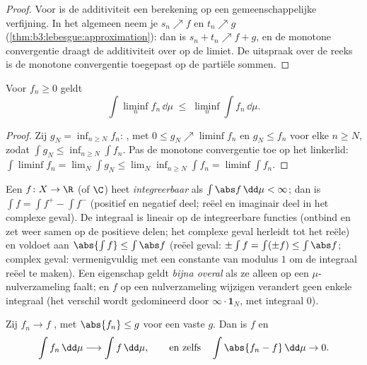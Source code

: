 \begin{proof}
Voor  is de additiviteit een berekening op een
gemeenschappelijke verfijning. In het algemeen neem je $s_n
\nearrow f$ en $t_n \nearrow g$
(\cref{thm:b3:lebesgue:approximation}): dan is $s_n + t_n \nearrow
f + g$, en de monotone convergentie draagt de additiviteit over op
de limiet. De uitspraak over de reeks is de monotone convergentie
toegepast op de partiële sommen.
\end{proof}

\begin{theorem}\label{thm:b3:lebesgue:fatou}
Voor  $f_n \geq 0$ geldt
\[
\int \liminf_n f_n \,\dd\mu \;\leq\; \liminf_n \int
f_n\,\dd\mu .
\]
\end{theorem}

\begin{proof}
Zij $g_N = \inf_{n\geq N}f_n$: , met $0 \leq g_N \nearrow
\liminf f_n$ en $g_N \leq f_n$ voor elke $n \geq N$, zodat $\int
g_N \leq \inf_{n \geq N}\int f_n$. Pas de monotone convergentie
toe op het linkerlid: $\int\liminf f_n = \lim_N\int g_N \leq
\lim_N\inf_{n\geq N}\int f_n = \liminf\int f_n$.
\end{proof}

\begin{definition}\label{def:b3:lebesgue:l1}
Een  $f \colon X \to \R$ (of $\C$) heet
\emph{integreerbaar} als
$\int\abs f\,\dd\mu < \infty$; dan is $\int f = \int f^+ - \int
f^-$ (positief en negatief deel; reëel en imaginair deel in het
complexe geval). De integraal is lineair op de integreerbare
functies (ontbind en zet weer samen op de positieve delen; het
complexe geval herleidt tot het reële) en voldoet aan $\abs{\int
f} \leq \int\abs f$ (reëel geval: $\pm\int f = \int(\pm f) \leq
\int\abs f$; complex geval: vermenigvuldig met een constante van
modulus $1$ om de integraal reëel te maken). Een eigenschap geldt
\emph{bijna overal} als ze alleen op een
$\mu$-nulverzameling faalt; en $f$ op een nulverzameling wijzigen
verandert geen enkele integraal (het verschil wordt gedomineerd
door $\infty\cdot\mathbf 1_N$, met integraal $0$).
\end{definition}

\begin{theorem}\label{thm:b3:lebesgue:dct}
Zij $f_n \to f$ , met $\abs{f_n} \leq g$ 
voor een vaste \emph{} $g$. Dan is $f$ 
en
\[
\int f_n\,\dd\mu \longrightarrow \int f\,\dd\mu,
\qquad\text{en zelfs}\quad \int\abs{f_n - f}\,\dd\mu \to 0 .
\]
\end{theorem}

